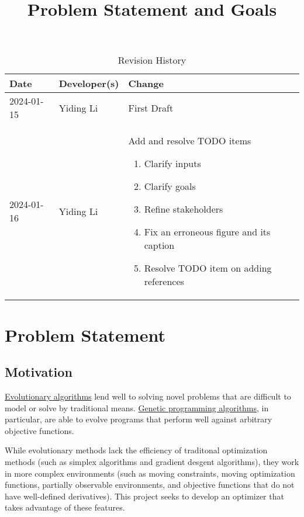 \documentclass{article}
\title{Problem Statement and Goals\\\progname}
\author{\authname}
\date{}
\begin{document}
\maketitle

\begin{table}[hp]
\caption{Revision History} \label{TblRevisionHistory}
\begin{tabularx}{\textwidth}{llX}
\toprule
\textbf{Date} & \textbf{Developer(s)} & \textbf{Change}\\
\midrule
2024-01-15 & Yiding Li & First Draft\\
2024-01-16 & Yiding Li & Add and resolve TODO items
\begin{enumerate}
    \item Clarify inputs
    \item Clarify goals
    \item Refine stakeholders
    \item Fix an erroneous figure and its caption
    \item Resolve TODO item on adding references
\end{enumerate}
\\
\bottomrule
\end{tabularx}
\end{table}

\section{Problem Statement}


\subsection{Motivation}


\hyperref[sec:evalg]{Evolutionary algorithms} lend well to solving novel problems that are difficult to model or solve by traditional means. \hyperref[sec:genalg]{Genetic programming algorithms}, in particular, are able to evolve programs that perform well against arbitrary objective functions.

While evolutionary methods lack the efficiency of traditonal optimization methods (such as simplex algorithms and gradient desgent algorithms), they work in more complex environments (such as moving constraints, moving optimization functions, partially observable environments, and objective functions that do not have well-defined derivatives). This project seeks to develop an optimizer that takes advantage of these features.
\end{document}
